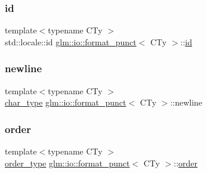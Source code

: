 \mbox{\label{classglm_1_1io_1_1format__punct_a763f60aeaecec9290917ed1d83b79838}} 
\subsubsection{\texorpdfstring{id}{id}}
{\footnotesize\ttfamily template$<$typename C\+Ty $>$ \\
std\+::locale\+::id \mbox{\hyperlink{classglm_1_1io_1_1format__punct}{glm\+::io\+::format\+\_\+punct}}$<$ C\+Ty $>$\+::\mbox{\hyperlink{_s_d_l__opengl__glext_8h_a58c2a664503e14ffb8f21012aabff3e9}{id}}\hspace{0.3cm}{\ttfamily [static]}}

\mbox{\label{classglm_1_1io_1_1format__punct_a8ddf8abdb0ebbdbb7eca08d7a777956e}} 
\subsubsection{\texorpdfstring{newline}{newline}}
{\footnotesize\ttfamily template$<$typename C\+Ty $>$ \\
\mbox{\hyperlink{classglm_1_1io_1_1format__punct_ae94c42484a4c5258ad7b2f0f029efdf3}{char\+\_\+type}} \mbox{\hyperlink{classglm_1_1io_1_1format__punct}{glm\+::io\+::format\+\_\+punct}}$<$ C\+Ty $>$\+::newline}

\mbox{\label{classglm_1_1io_1_1format__punct_a9de1f3b7120a036ec0ab394d2036d0aa}} 
\subsubsection{\texorpdfstring{order}{order}}
{\footnotesize\ttfamily template$<$typename C\+Ty $>$ \\
\mbox{\hyperlink{namespaceglm_1_1io_a3497781803fe594a37177e05ab2a795f}{order\+\_\+type}} \mbox{\hyperlink{classglm_1_1io_1_1format__punct}{glm\+::io\+::format\+\_\+punct}}$<$ C\+Ty $>$\+::\mbox{\hyperlink{structglm_1_1io_1_1order}{order}}}

